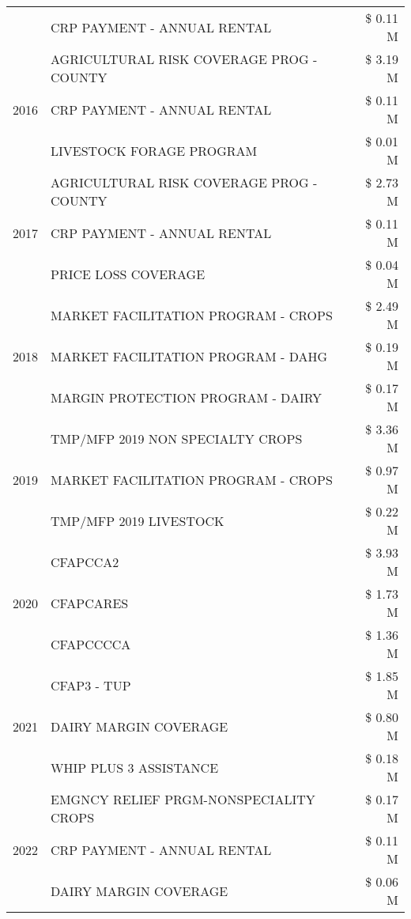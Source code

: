 \begin{tabular}{llr}
 & CRP PAYMENT - ANNUAL RENTAL & \$ 0.11 M \\
\cline{1-3}
\multirow[t]{3}{*}{2016} & AGRICULTURAL RISK COVERAGE PROG - COUNTY & \$ 3.19 M \\
 & CRP PAYMENT - ANNUAL RENTAL & \$ 0.11 M \\
 & LIVESTOCK FORAGE PROGRAM & \$ 0.01 M \\
\cline{1-3}
\multirow[t]{3}{*}{2017} & AGRICULTURAL RISK COVERAGE PROG - COUNTY & \$ 2.73 M \\
 & CRP PAYMENT - ANNUAL RENTAL & \$ 0.11 M \\
 & PRICE LOSS COVERAGE & \$ 0.04 M \\
\cline{1-3}
\multirow[t]{3}{*}{2018} & MARKET FACILITATION PROGRAM - CROPS & \$ 2.49 M \\
 & MARKET FACILITATION PROGRAM - DAHG & \$ 0.19 M \\
 & MARGIN PROTECTION PROGRAM - DAIRY & \$ 0.17 M \\
\cline{1-3}
\multirow[t]{3}{*}{2019} & TMP/MFP 2019 NON SPECIALTY CROPS & \$ 3.36 M \\
 & MARKET FACILITATION PROGRAM - CROPS & \$ 0.97 M \\
 & TMP/MFP 2019 LIVESTOCK & \$ 0.22 M \\
\cline{1-3}
\multirow[t]{3}{*}{2020} & CFAPCCA2 & \$ 3.93 M \\
 & CFAPCARES & \$ 1.73 M \\
 & CFAPCCCCA & \$ 1.36 M \\
\cline{1-3}
\multirow[t]{3}{*}{2021} & CFAP3 - TUP & \$ 1.85 M \\
 & DAIRY MARGIN COVERAGE & \$ 0.80 M \\
 & WHIP PLUS 3 ASSISTANCE & \$ 0.18 M \\
\cline{1-3}
\multirow[t]{3}{*}{2022} & EMGNCY RELIEF PRGM-NONSPECIALITY CROPS & \$ 0.17 M \\
 & CRP PAYMENT - ANNUAL RENTAL & \$ 0.11 M \\
 & DAIRY MARGIN COVERAGE & \$ 0.06 M \\
\cline{1-3}
\bottomrule
\end{tabular}
